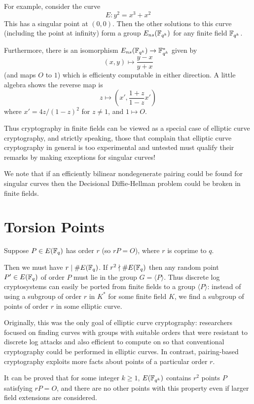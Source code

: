 For example, consider the curve
\[ E : y^2 = x^3 + x^2 \]
This has a singular point at $(0,0)$. Then the other solutions to
this curve (including the point at infinity) form a group
$E_{ns}(\mathbb{F}_{q^k})$ for any finite field $\mathbb{F}_{q^k}$.

Furthermore, there is an isomorphism $E_{ns}(\mathbb{F}_{q^k}) \rightarrow \mathbb{F}_{q^k}^*$
given by
\[ (x,y) \mapsto \frac{y-x}{y+x} \]
(and maps $O$ to $1$)
which is efficienty computable in either direction.
A little algebra
shows the reverse map is
\[ z \mapsto \left( x', \frac{1+z}{1-z} x' \right) \]
where $x' = 4z/(1-z)^2$ for $z \ne 1$, and $1 \mapsto O$.

Thus cryptography in finite fields can be viewed as a special
case of elliptic curve cryptography, and strictly speaking,
those that complain that elliptic curve cryptography in general
is too experimental and untested must qualify
their remarks by making exceptions for singular curves!

We note that if an efficiently bilinear nondegenerate pairing could be found
for singular curves then the Decisional Diffie-Hellman problem could be broken
in finite fields.

\section {Torsion Points}

Suppose $P\in E(\mathbb{F}_q)$ has order $r$ (so $r P = O$),
where $r$ is coprime to $q$.

Then we must have $r \mid \#E(\mathbb{F}_q)$.
If $r^2 \nmid \#E(\mathbb{F}_q)$ then any random point $P' \in E(\mathbb{F}_q)$
of order $P$ must lie in the group $G = \langle P \rangle$.
Thus discrete log cryptosystems can easily be ported from finite fields
to a group $\langle P \rangle$: instead of using a subgroup of order
$r$ in $K^*$ for some finite field $K$,
we find a subgroup of points of order $r$ in some elliptic curve.

Originally, this was the only goal of elliptic curve cryptography:
researchers focused on finding curves with groups with
suitable orders that were resistant to discrete log attacks and also
efficient to compute on so that conventional cryptography could be
performed in elliptic curves.
In contrast, pairing-based cryptography exploits more facts
about points of a particular order $r$.

It can be proved that for some integer $k \ge 1$,
$E(\mathbb{F}_{q^k})$ contains $r^2$ points $P$ satisfying $r P = O$,
and there are no other points with this property even if larger field
extensions are considered.

